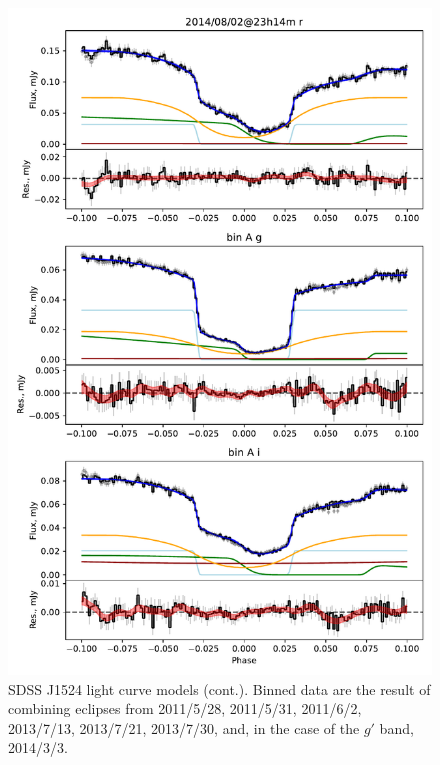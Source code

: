 \begin{figure}
    \centering
    \includegraphics[width=\textwidth]{figures/results/SDSS1524/SDSS1524_2.pdf}
    \caption{SDSS J1524 light curve models (cont.). Binned data are the result of combining eclipses from 2011/5/28, 2011/5/31, 2011/6/2, 2013/7/13, 2013/7/21, 2013/7/30, and, in the case of the $g'$ band, 2014/3/3.}
    \label{fig:SDSS1524 all light curves cont 1}
\end{figure}
